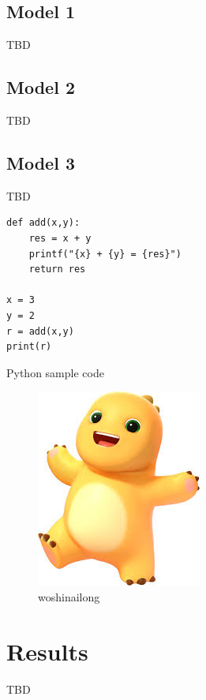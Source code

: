 \documentclass[a4paper,11pt]{article}
\begin{document}
\subsection{Model 1}
TBD

\subsection{Model 2}
TBD

\subsection{Model 3}
TBD

\begin{listing}[!ht]
\begin{verbatim}
def add(x,y):
    res = x + y
    printf("{x} + {y} = {res}")
    return res

x = 3
y = 2
r = add(x,y)
print(r)
\end{verbatim}
\caption{Python sample code}
\label{listing:python}
\end{listing}

\begin{figure}[H]
    \centering
    \includegraphics[scale=0.7]{./img/nailong.jpg}
    \caption[nailong] {woshinailong}
\end{figure}

\section{Results}
TBD
\end{document}
